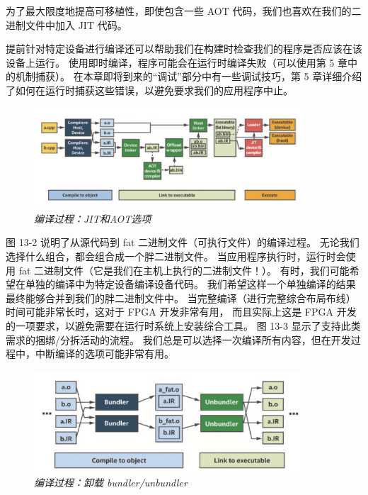 \begin{remark}
	为了最大限度地提高可移植性，即使包含一些 AOT 代码，我们也喜欢在我们的二进制文件中加入 JIT 代码。
\end{remark}

提前针对特定设备进行编译还可以帮助我们在构建时检查我们的程序是否应该在该设备上运行。 
使用即时编译，程序可能会在运行时编译失败（可以使用第 5 章中的机制捕获）。 
在本章即将到来的“调试”部分中有一些调试技巧，第 5 章详细介绍了如何在运行时捕获这些错误，以避免要求我们的应用程序中止。

\begin{figure}[H]
	\centering
	\includegraphics[width=0.9\textwidth]{figs/F13.2.png}
	\caption{\textit{编译过程：JIT和AOT选项 }}
\end{figure}

图 13-2 说明了从源代码到 fat 二进制文件（可执行文件）的编译过程。 
无论我们选择什么组合，都会组合成一个胖二进制文件。 
当应用程序执行时，运行时会使用 fat 二进制文件（它是我们在主机上执行的二进制文件！）。 
有时，我们可能希望在单独的编译中为特定设备编译设备代码。 
我们希望这样一个单独编译的结果最终能够合并到我们的胖二进制文件中。 
当完整编译（进行完整综合布局布线）时间可能非常长时，这对于 FPGA 开发非常有用，
而且实际上这是 FPGA 开发的一项要求，以避免需要在运行时系统上安装综合工具。 
图 13-3 显示了支持此类需求的捆绑/分拆活动的流程。 
我们总是可以选择一次编译所有内容，但在开发过程中，中断编译的选项可能非常有用。

\begin{figure}[H]
	\centering
	\includegraphics[width=0.9\textwidth]{figs/F13.3.png}
	\caption{\textit{编译过程：卸载 bundler/unbundler }}
\end{figure}

